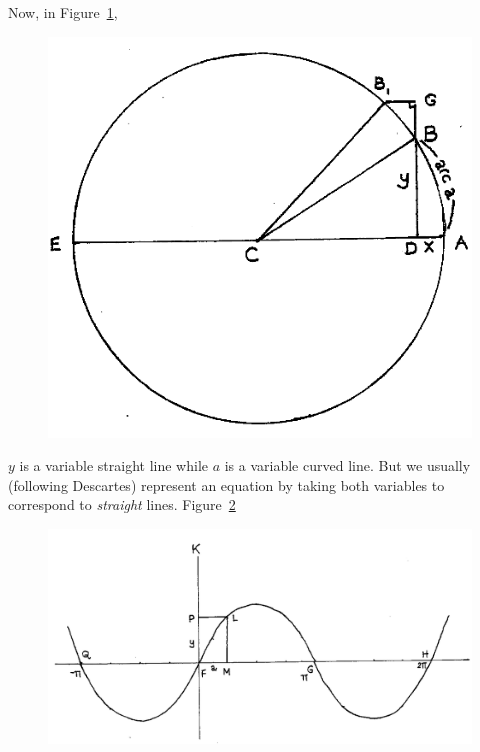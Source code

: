 \documentclass[polutonikogreek,english,twoside,openright]{article}
\begin{document}
Now, in Figure~\ref{circarc2},
\addtocounter{figure}{-1}
\begin{figure}[htp]
\begin{center}
\includegraphics[width=.65\textwidth]{fig/Figure42}
\caption{}
\label{circarc2}
\vspace{-10pt}
\end{center}
\end{figure} 
 $y$ is a variable straight line while $a$ is a variable curved line.  But we usually (following Descartes) represent an equation by taking both variables to correspond to {\em straight} lines.  Figure~\ref{sinecurve}
\begin{figure}[htp]
\begin{center}
\includegraphics[width=\textwidth]{fig/Figure48}
\caption{}
\label{sinecurve}
\vspace{-10pt}
\end{center}
\end{figure} 
\end{document}
